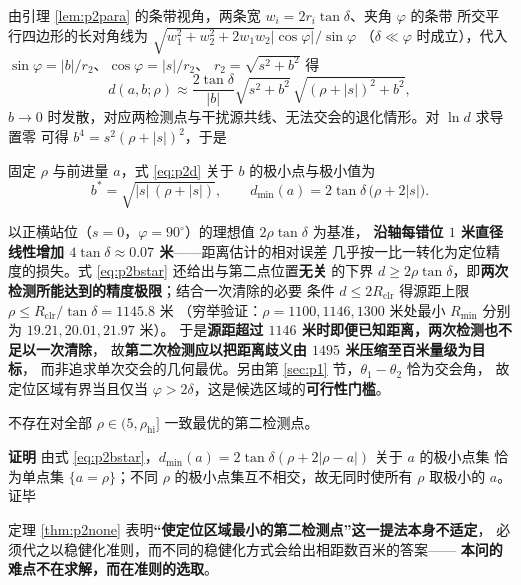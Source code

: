 \documentclass[withoutpreface, bwprint]{cumcmthesis}
\renewenvironment{proof}{\par\noindent\textbf{证明}\quad}{\hfill 证毕\par\medskip}
\begin{document}
由引理 \ref{lem:p2para} 的条带视角，两条宽 $w_i=2r_i\tan\delta$、夹角 $\varphi$ 的条带
所交平行四边形的长对角线为 $\sqrt{w_1^2+w_2^2+2w_1w_2\lvert\cos\varphi\rvert}/\sin\varphi$
（$\delta\ll\varphi$ 时成立），代入 $\sin\varphi=|b|/r_2$、$\cos\varphi=|s|/r_2$、
$r_2=\sqrt{s^2+b^2}$ 得
\begin{equation}
  d(a,b;\rho)\approx\frac{2\tan\delta}{|b|}\sqrt{s^2+b^2}\,\sqrt{(\rho+|s|)^2+b^2},
  \label{eq:p2d}
\end{equation}
$b\to0$ 时发散，对应两检测点与干扰源共线、无法交会的退化情形。对 $\ln d$ 求导置零
可得 $b^4=s^2(\rho+|s|)^2$，于是

\begin{theorem}[最优侧移与最小直径]
\label{thm:p2opt}
固定 $\rho$ 与前进量 $a$，式 \eqref{eq:p2d} 关于 $b$ 的极小点与极小值为
\begin{equation}
  b^{*}=\sqrt{|s|\,(\rho+|s|)},
  \qquad
  d_{\min}(a)=2\tan\delta\,\bigl(\rho+2|s|\bigr).
  \label{eq:p2bstar}
\end{equation}
\end{theorem}

以正横站位（$s=0$，$\varphi=90^\circ$）的理想值 $2\rho\tan\delta$ 为基准，
\textbf{沿轴每错位 $1$ 米直径线性增加 $4\tan\delta\approx0.07$ 米}——距离估计的相对误差
几乎按一比一转化为定位精度的损失。式 \eqref{eq:p2bstar} 还给出与第二点位置\textbf{无关}
的下界 $d\ge 2\rho\tan\delta$，即\textbf{两次检测所能达到的精度极限}；结合一次清除的必要
条件 $d\le2R_{\mathrm{clr}}$ 得源距上限 $\rho\le R_{\mathrm{clr}}/\tan\delta=1145.8$ 米
（穷举验证：$\rho=1100,1146,1300$ 米处最小 $R_{\min}$ 分别为 $19.21,20.01,21.97$ 米）。
于是\textbf{源距超过 $1146$ 米时即便已知距离，两次检测也不足以一次清除}，
故\textbf{第二次检测应以把距离歧义由 $1495$ 米压缩至百米量级为目标}，
而非追求单次交会的几何最优。另由第 \ref{sec:p1} 节，$\theta_1-\theta_2$ 恰为交会角，
故定位区域有界当且仅当 $\varphi>2\delta$，这是候选区域的\textbf{可行性门槛}。

\begin{theorem}[一致最优点的不存在性]
\label{thm:p2none}
不存在对全部 $\rho\in(5,\rho_{\mathrm{hi}}]$ 一致最优的第二检测点。
\end{theorem}

\begin{proof}
由式 \eqref{eq:p2bstar}，$d_{\min}(a)=2\tan\delta(\rho+2|\rho-a|)$ 关于 $a$ 的极小点集
恰为单点集 $\{a=\rho\}$；不同 $\rho$ 的极小点集互不相交，故无同时使所有 $\rho$ 取极小的 $a$。
\end{proof}

定理 \ref{thm:p2none} 表明\textbf{“使定位区域最小的第二检测点”这一提法本身不适定}，
必须代之以稳健化准则，而不同的稳健化方式会给出相距数百米的答案——
\textbf{本问的难点不在求解，而在准则的选取}。
\end{document}
